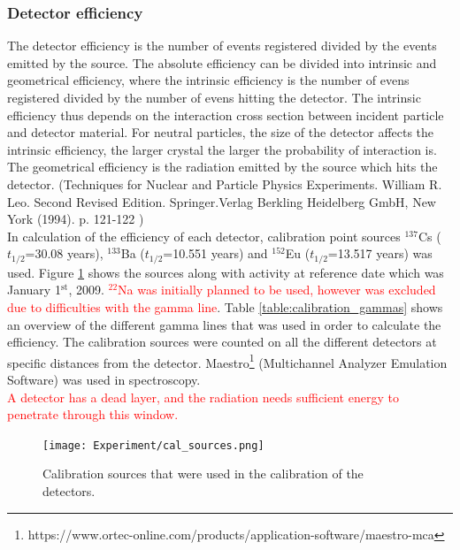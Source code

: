 \documentclass[a4paper,11pt,twoside]{book}
\begin{document}
\subsubsection{Detector efficiency}
The detector efficiency is the number of events registered divided by the events emitted by the source. The absolute efficiency can be divided into intrinsic and geometrical efficiency, where the intrinsic efficiency is the number of evens registered divided by the number of evens hitting the detector. The intrinsic efficiency thus depends on the interaction cross section between incident particle and detector material. For neutral particles, the size of the detector affects the intrinsic efficiency, the larger crystal the larger the probability of interaction is. The geometrical efficiency is the radiation emitted by the source which hits the detector. (Techniques for Nuclear and Particle Physics Experiments. William R. Leo. Second Revised Edition. Springer.Verlag Berkling Heidelberg GmbH, New York (1994). p. 121-122 )\\ 




\noindent 
In calculation of the efficiency of each detector, calibration point sources $^{137}$Cs ($t_{1/2}$=30.08 years), $^{133}$Ba ($t_{1/2}$=10.551 years) and $^{152}$Eu ($t_{1/2}$=13.517 years) was used. Figure \ref{fig:cal_sources} shows the sources along with activity at reference date which was January 1$^{\text{st}}$, 2009. \textcolor{red}{ $^{22}$Na was initially planned to be used, however was excluded due to difficulties with the gamma line}. Table \ref{table:calibration_gammas} shows an overview of the different gamma lines that was used in order to calculate the efficiency. The calibration sources were counted on all the different detectors at specific distances from the detector. Maestro\footnote{https://www.ortec-online.com/products/application-software/maestro-mca} (Multichannel Analyzer Emulation Software) was used in spectroscopy.  \\

\noindent 
\textcolor{red}{
A detector has a dead layer, and the radiation needs sufficient energy to penetrate through this window. }


\begin{figure}
    \centering
    \texttt{[image: Experiment/cal\_sources.png]}
    \caption{Calibration sources that were used in the calibration of the detectors.}
    \label{fig:cal_sources}
\end{figure}
\end{document}
